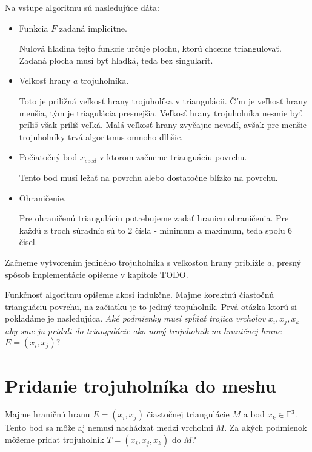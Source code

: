 Na vstupe algoritmu sú nasledujúce dáta:
\begin{itemize}
    \item{
        Funkcia $F$ zadaná implicitne.

        Nulová hladina tejto funkcie určuje plochu, ktorú chceme triangulovať. 
        Zadaná plocha musí byť hladká, teda bez singularít.
    }
    \item{
        Veľkosť hrany $a$ trojuholníka.

        Toto je priližná veľkosť hrany trojuholíka v triangulácii. 
        Čím je veľkosť hrany menšia, tým je triagulácia presnejšia. Veľkosť hrany trojuholníka 
        nesmie byť príliš však príliš veľká. Malá veľkosť hrany zvyčajne nevadí, avšak pre 
        menšie trojuholníky trvá algoritmus omnoho dlhšie.
    }
    \item{
        Počiatočný bod $x_{seed}$ v ktorom začneme trianguáciu povrchu. 

        Tento bod musí ležať na povrchu alebo dostatočne blízko na povrchu.
    }
    \item{
        Ohraničenie.

        Pre ohraničenú trianguláciu potrebujeme zadať hranicu ohraničenia. Pre každú z troch súradníc 
        sú to 2 čísla - minimum a maximum, teda spolu 6 čísel.
    }
\end{itemize}

Začneme vytvorením jediného trojuholníka s veľkosťou hrany približle $a$, presný spôsob implementácie
opíšeme v kapitole TODO.

Funkčnosť algoritmu opíšeme akosi indukčne. Majme korektnú čiastočnú trianguáciu povrchu, na začiatku
je to jediný trojuholník. Prvá otázka ktorú si pokladáme je nasledujúca. 
\textit{Aké podmienky musí spĺňať trojica vrcholov} $x_i, x_j, x_k$ 
\textit{aby sme ju pridali do triangulácie ako nový trojuholník na hraničnej hrane} $E = (x_i, x_j)?$ 

\section{Pridanie trojuholníka do meshu}
\label{kap:triangle_conditions}

Majme hraničnú hranu $E=(x_i, x_j)$ čiastočnej triangulácie $M$ a bod $x_k \in \mathbb{E}^3$. 
Tento bod sa môže aj nemusí nachádzať medzi vrcholmi $M$. Za akých podmienok môžeme pridať trojuholník 
$T=(x_i, x_j, x_k)$ do $M$?

